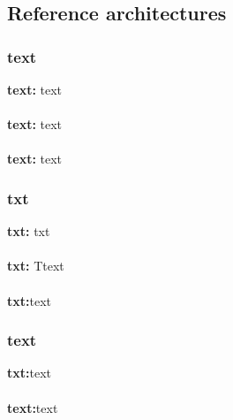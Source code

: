 \subsection{Reference architectures}
\subsubsection{text}
{\bfseries text:} text
\\ \\
{\bfseries text:} text
\\ \\
{\bfseries text:} text

\subsubsection{txt}
{\bfseries txt:} txt
\\ \\
{\bfseries txt:} Ttext
	\\ \\
	{\bfseries txt:}text
\subsubsection{text}
	{\bfseries txt:}text
	\\ \\
	{\bfseries text:}text